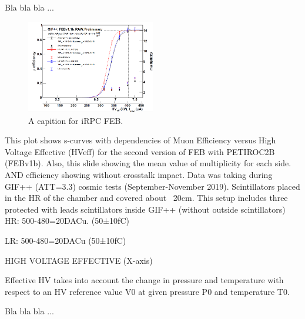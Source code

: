 Bla bla bla ...

\begin{figure}
    \caption{A capition for iRPC FEB.}\label{irpc_feb}
    \includegraphics[width=0.5\textwidth]{uioposter-images/irpc_feb_eff}
\end{figure}

This plot shows s-curves with dependencies of Muon Efficiency versus High Voltage Effective (HVeff) for the second version of FEB with PETIROC2B (FEBv1b). Also, this slide showing the mean value of multiplicity for each side. AND efficiency showing without crosstalk impact. Data was taking during GIF++ (ATT=3.3) cosmic tests (September-November 2019). Scintillators placed in the HR of the chamber and covered about ~20cm. This setup includes three protected with leads scintillators inside GIF++ (without outside scintillators)
HR: 500-480=20DACu. (50±10fC)

LR: 500-480=20DACu (50±10fC)

HIGH VOLTAGE EFFECTIVE (X-axis)

Effective HV takes into account the change in pressure and temperature with respect to an HV reference value V0 at given pressure P0 and temperature T0.






Bla bla bla ...